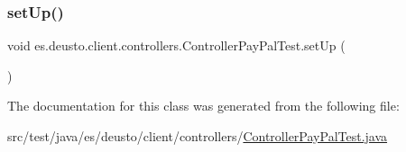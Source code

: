 \subsubsection{\texorpdfstring{setUp()}{setUp()}}
{\footnotesize\ttfamily void es.\+deusto.\+client.\+controllers.\+Controller\+Pay\+Pal\+Test.\+set\+Up (\begin{DoxyParamCaption}{ }\end{DoxyParamCaption})}



The documentation for this class was generated from the following file\+:\begin{DoxyCompactItemize}
\item 
src/test/java/es/deusto/client/controllers/\mbox{\hyperlink{_controller_pay_pal_test_8java}{Controller\+Pay\+Pal\+Test.\+java}}\end{DoxyCompactItemize}
